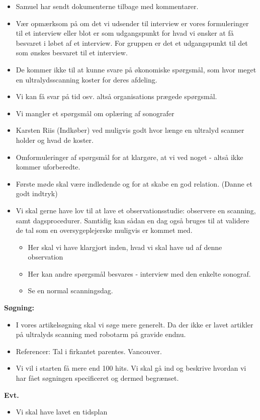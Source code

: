 \begin{itemize}
\item Samuel har sendt dokumenterne tilbage med kommentarer.
\item Vær opmærksom på om det vi udsender til interview er vores formuleringer til et interview eller blot er som udgangspunkt for hvad vi ønsker at få besvaret i løbet af et interview. For gruppen er det et udgangspunkt til det som ønskes besvaret til et interview.
\item De kommer ikke til at kunne svare på økonomiske spørgsmål, som hvor meget en ultralydsscanning koster for deres afdeling.
\item Vi kan få svar på tid osv. altså organisations prægede spørgsmål.
\item Vi mangler et spørgsmål om oplæring af sonografer
\item Karsten Riis (Indkøber) ved muligvis godt hvor længe en ultralyd scanner holder og hvad de koster.
\item Omformuleringer af spørgsmål for at klargøre, at vi ved noget - altså ikke kommer uforberedte.
\item Første møde skal være indledende og for at skabe en god relation. (Danne et godt indtryk)
\item Vi skal gerne have lov til at lave et observationsstudie: observere en scanning, samt dagsprocedurer. Samtidig kan sådan en dag også bruges til at validere de tal som en oversygeplejerske muligvis er kommet med.
\begin{itemize}
\item Her skal vi have klargjort inden, hvad vi skal have ud af denne observation
\item Her kan andre spørgsmål besvares - interview med den enkelte sonograf.
\item Se en normal scanningsdag. 
\end{itemize}
\end{itemize}
\textbf{Søgning:}
\begin{itemize}
\item I vores artikelsøgning skal vi søge mere generelt. Da der ikke er lavet artikler på ultralyds scanning med robotarm på gravide endnu.
\item Referencer: Tal i firkantet parentes. Vancouver.
\item Vi vil i starten få mere end 100 hits. Vi skal gå ind og beskrive hvordan vi har fået søgningen specificeret og dermed begrænset.
\end{itemize}
\textbf{Evt.}
\begin{itemize}
\item Vi skal have lavet en tidsplan
\end{itemize}
\newpage